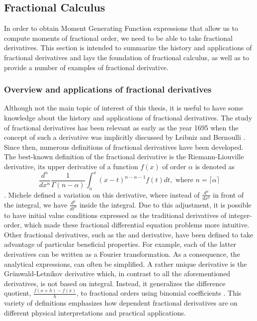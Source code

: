 \subsection{Fractional Calculus}\label{s:calculus}
In order to obtain Moment Generating Function expressions that allow us to compute moments of fractional order, we need to be able to take fractional derivatives. This section is intended to summarize the history and applications of fractional derivatives and lays the foundation of fractional calculus, as well as to provide a number of examples of fractional derivative.
\subsubsection{Overview and applications of fractional derivatives}\label{ss:calculus_introduction}
Although not the main topic of interest of this thesis, it is useful to have some knowledge about the history and applications of fractional derivatives. The study of fractional derivatives has been relevant as early as the year 1695 when the concept of such a derivative was implicitly discussed by Leibniz and Bernoulli \cite{katugampola2014}. Since then, numerous definitions of fractional derivatives have been developed. The best-known definition of the fractional derivative is the Riemann-Liouville derivative, its upper derivative of a function \(f(x)\) of order \(\alpha\) is denoted as 
\[\frac{d^n}{dx^n}\frac{1}{\Gamma(n -\alpha)} \int_{a}^{x} (x-t)^{n - \alpha -1} f(t) dt, \text{ where }n = \lceil\alpha \rceil \] \cite{kilbas2006}.
Michele \cite{caputo1967} defined a variation on this derivative, where instead of \(\frac{d^n}{dx^n}\) in front of the integral, we have \(\frac{d^n}{dt^n}\) inside the integral. Due to this adjustment, it is possible to have initial value conditions expressed as the traditional derivatives of integer-order, which made these fractional differential equation problems more intuitive. Other fractional derivatives, such as the \cite{hadamard1892} and \cite{riesz1949} derivative, have been defined to take advantage of particular beneficial properties. For example, each of the latter derivatives can be written as a Fourier transformation. As a consequence, the analytical expressions, can often be simplified. A rather unique derivative is the Grünwald-Letnikov derivative which, in contrast to all the aforementioned derivatives, is not based on integral. Instead, it generalizes the difference quotient, \(\frac{f(x+h) - f(x)}{h}\),  to fractional orders using binomial coefficients \cite{atici2021}. This variety of definitions emphasizes how dependent fractional derivatives are  on different physical interpretations and practical applications.
